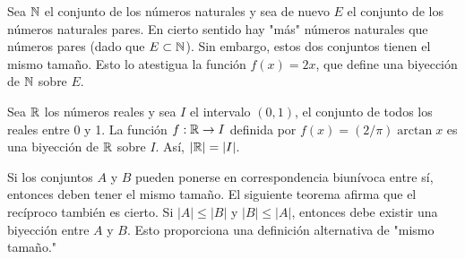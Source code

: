 \message{ !name(main.tex)}\documentclass[12pt,a4paper]{book}
\newcommand{\comillas}[1]{"#1"}
\begin{document}
    \begin{ejemplo}
        Sea $\mathbb{N}$ el conjunto de los números naturales y sea de nuevo $E$ el conjunto de los números naturales pares. En
        cierto sentido hay \comillas{más} números naturales que números pares (dado que $E\subset\mathbb{N}$). Sin embargo, estos
        dos conjuntos tienen el mismo tamaño. Esto lo atestigua la función $f(x)=2x$, que define una biyección de $\mathbb{N}$
        sobre $E$.
    \end{ejemplo}

    \begin{ejemplo}\label{ej:R-I-mismo-tamano}
        Sea $\mathbb{R}$ los números reales y sea $I$ el intervalo $(0,1)$, el conjunto de todos los reales entre 0 y 1. La función
        $f:\mathbb{R}\rightarrow I$ definida por $f(x)=(2/\pi)\arctan x$ es una biyección de $\mathbb{R}$ sobre $I$. Así, $|\mathbb{R}|=|I|$.
    \end{ejemplo}

    Si los conjuntos $A$ y $B$ pueden ponerse en correspondencia biunívoca entre sí, entonces deben tener el mismo tamaño.
    El siguiente teorema afirma que el recíproco también es cierto. Si $|A|\leq|B|$ y $|B|\leq|A|$, entonces debe existir
    una biyección entre $A$ y $B$. Esto proporciona una definición alternativa de \comillas{mismo tamaño.}
\end{document}
